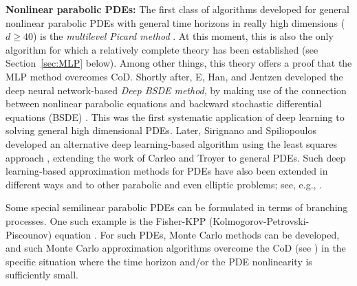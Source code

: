 \documentclass[12pt,AutoFakeBold,AutoFakeSlant]{article}
\theoremstyle{definition}
\begin{document}
	\vspace{.1in}
	\noindent
	{\bf  Nonlinear parabolic PDEs: }
	The first class of algorithms developed for general nonlinear parabolic PDEs with general time horizons 
	in really high dimensions ($d\geq 40$) is the 
	{\it multilevel Picard method} \cite{E2016multilevel,E2019multilevel,Hutzenthaleretal2018arXiv}. 
	At this moment, this is also the only algorithm for which a relatively complete theory has been established 
	(see Section~\ref{sec:MLP} below).
	Among other things, this theory offers a proof that the MLP method overcomes CoD.
	Shortly after, E, Han, and Jentzen developed 
	the deep neural network-based {\it Deep BSDE method},
	by making use of the connection between nonlinear parabolic equations and backward stochastic differential
	equations (BSDE) \cite{EHanJentzen2017, HanJentzenE2018}. 
	This was the first systematic application of deep learning to solving general high dimensional PDEs. 
	Later, Sirignano and Spiliopoulos developed an alternative deep learning-based algorithm using the least squares approach 
	\cite{Sirignano2018dgm}, extending the work of Carleo and Troyer  \cite{carleo2017solving} to general PDEs. 
	Such deep learning-based approximation methods for PDEs have also been 
	extended in different ways and to other parabolic and even elliptic problems; 
	see, e.g., \cite{beck2019machine,BeckerCheridito2019,raissi2018forward,BeckBeckerCheridito2019,BeckerCheriditoJentzen2019,HurePhamWarin2019,ChanMikaelWarin2019,Henry2017deep,han2019solving,ji2020three,han2020solving}.

	Some special semilinear parabolic PDEs can be formulated in terms of branching processes. 
	One such example is the Fisher-KPP (Kolmogorov-Petrovski-Piscounov) equation \cite{Fisher1937wave,KPP1937,Mckean1975application}. 
	For such PDEs, Monte Carlo methods can be developed, and such Monte Carlo approximation algorithms overcome the CoD 
	(see \cite{skorokhod1964branching,watanabe1965branching,Henry-Labordere2012,
	Henry-Labordere2014,chang2016branching,warin2017variations,henry2019branching}) 
	in the specific situation where the time horizon and/or the PDE nonlinearity is sufficiently small.
\end{document}
